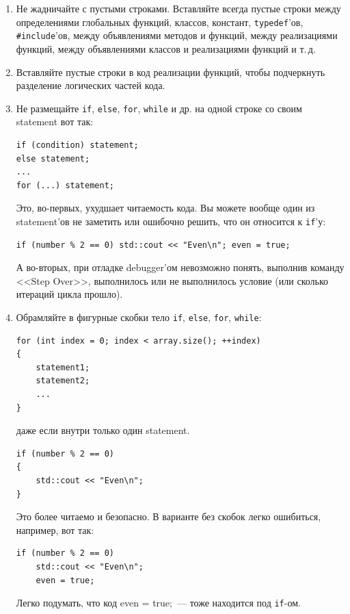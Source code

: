 \documentclass[a4paper,10pt]{article}
\begin{document}
\begin{enumerate}
    \item Не жадничайте с пустыми строками. Вставляйте всегда пустые строки между 
        определениями глобальных функций, классов, констант, {\tt typedef}’ов,
        {\tt \#include}’ов, между объявлениями методов и функций, между реализациями
        функций, между объявлениями классов и реализациями функций и т.\,д.
    \item Вставляйте пустые строки в код реализации функций, чтобы подчеркнуть
        разделение логических частей кода.

    \item Не размещайте {\tt if}, {\tt else}, {\tt for}, {\tt while} и др. на одной строке со своим
        statement вот так:
        \begin{lstlisting}
if (condition) statement;
else statement;
...
for (...) statement;
        \end{lstlisting}
        Это, во-первых, ухудшает читаемость кода. Вы можете вообще один из
        statement’ов не заметить или ошибочно решить, что он относится к {\tt if}’у:

        \begin{lstlisting}
if (number % 2 == 0) std::cout << "Even\n"; even = true;
        \end{lstlisting}
        А во-вторых, при отладке debugger’ом невозможно понять, выполнив команду <<Step Over>>, выполнилось или не выполнилось условие (или сколько
        итераций цикла прошло).            

    \item Обрамляйте в фигурные скобки тело {\tt if}, {\tt else}, {\tt for}, {\tt while}:
        \begin{lstlisting}
for (int index = 0; index < array.size(); ++index)
{
    statement1;
    statement2;
    ...
}
        \end{lstlisting}
             даже если внутри только один statement.
        \begin{lstlisting}
if (number % 2 == 0)
{
    std::cout << "Even\n";
}
        \end{lstlisting}

        Это более читаемо и безопасно. В варианте без скобок легко ошибиться,
        например, вот так:
        \begin{lstlisting}
if (number % 2 == 0)
    std::cout << "Even\n";
    even = true;
        \end{lstlisting}
        Легко подумать, что код even = true;~— тоже находится под {\tt if}-ом.


\end{enumerate}
\end{document}
